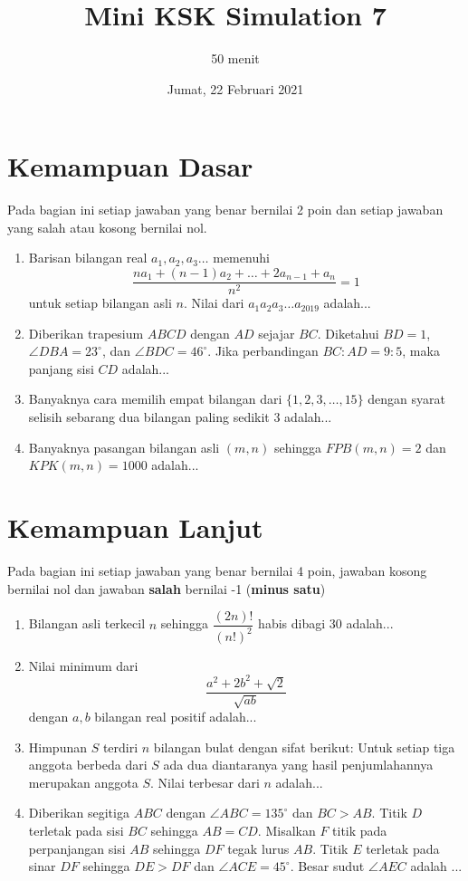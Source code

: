 \documentclass{article}
\title{Mini KSK Simulation 7 }
\author{50 menit}
\date{Jumat, 22 Februari 2021}
\begin{document}
	\maketitle
	
	\section{Kemampuan Dasar}
	Pada bagian ini setiap jawaban yang benar bernilai 2 poin dan setiap jawaban yang salah
	atau kosong bernilai nol.
	\begin{enumerate}
		
		\item
		Barisan bilangan real $a_1,a_2,a_3\dots$ memenuhi $$\frac{na_1+(n-1)a_2+\dots+2a_{n-1}+a_n}{n^2} = 1$$ untuk setiap bilangan asli $n$. Nilai dari $a_1a_2a_3\dots a_{2019}$ adalah...
		\item
		Diberikan trapesium $ABCD$ dengan $AD$ sejajar $BC$. Diketahui $BD=1$, $\angle DBA = 23^\circ$, dan $\angle BDC = 46^\circ$. Jika perbandingan $BC:AD=9:5$, maka panjang sisi $CD$ adalah...
		
		
		
		\item
		Banyaknya cara memilih empat bilangan dari $\{1,2,3,\dots,15\}$ dengan syarat selisih sebarang dua bilangan paling sedikit 3 adalah...
		
		\item
		Banyaknya pasangan bilangan asli $(m,n)$ sehingga $FPB(m,n)=2$ dan $KPK(m,n)=1000$ adalah...
	\end{enumerate}
\section{Kemampuan Lanjut}
Pada bagian ini setiap jawaban yang benar bernilai 4 poin, jawaban kosong bernilai nol
dan jawaban \textbf{salah} bernilai -1 (\textbf{minus satu})
\begin{enumerate}
		\item
		Bilangan asli terkecil $n$ sehingga $\dfrac{(2n)!}{(n!)^2}$ habis dibagi 30 adalah...
	


		
		\item
		Nilai minimum dari $$\frac{a^2+2b^2+\sqrt{2}}{\sqrt{ab}}$$ dengan $a,b$ bilangan real positif adalah...
		
		\item
		Himpunan $S$ terdiri $n$ bilangan bulat dengan sifat berikut: Untuk setiap tiga anggota berbeda dari $S$ ada dua diantaranya yang hasil penjumlahannya merupakan anggota $S$. Nilai terbesar dari $n$ adalah...
		
		\item
		Diberikan segitiga $ABC$ dengan $\angle ABC = 135^\circ$ dan $BC>AB$. Titik $D$ terletak pada sisi $BC$ sehingga $AB=CD$. Misalkan $F$ titik pada perpanjangan sisi $AB$ sehingga $DF$ tegak lurus $AB$. Titik $E$ terletak pada sinar $DF$ sehingga $DE>DF$ dan $\angle ACE = 45^\circ$. Besar sudut $\angle AEC $ adalah ...
		
	\end{enumerate}
		
\end{document}
